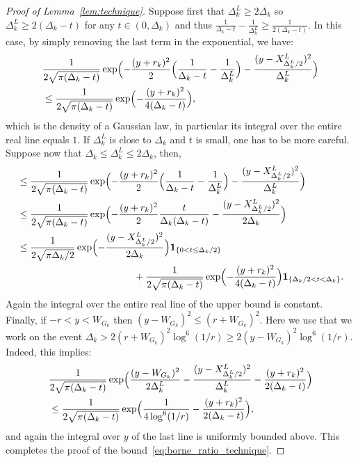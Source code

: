 \documentclass[british, a4paper,11pt]{article}
\numberwithin{equation}{section}
\theoremstyle{definition}
\newcommand{\ind}[1]{\mathbf{1}_{\{#1\}}}
\begin{document}
\begin{proof}[Proof of Lemma~\ref{lem:technique}]
Suppose first that $\Delta^L_k \geq 2 \Delta_k$ so $\Delta^L_k \geq 2 (\Delta_k-t)$ for any $t \in (0, \Delta_k)$ and thus $\frac{1}{\Delta_k-t}-\frac{1}{\Delta^L_k} \geq \frac{1}{2(\Delta_k-t)}$. In this case, by simply removing the last term in the exponential, we have:
\begin{align*}
&\frac{1}{2\sqrt{\pi(\Delta_k-t)}} \exp\Bigl(- \frac{(y+r_{k})^2}{2} \Bigl(\frac{1}{\Delta_k-t}-\frac{1}{\Delta^L_k}\Bigr) - \frac{(y-X^L_{\Delta^L_k/2})^2}{\Delta^L_k}\Bigr)
\\
&\leq \frac{1}{2\sqrt{\pi(\Delta_k-t)}} \exp\Bigl(- \frac{(y+r_{k})^2}{4(\Delta_k-t)}\Bigr)
,\end{align*}
which is the density of a Gaussian law, in particular its integral over the entire real line equals $1$. If $\Delta^L_k$ is close to $\Delta_k$ and $t$ is small, one has to be more careful.
Suppose now that $\Delta_k \leq \Delta^L_k \leq 2 \Delta_k$, then,
\begin{align*}
&\leq \frac{1}{2\sqrt{\pi(\Delta_k-t)}} \exp\Bigl(- \frac{(y+r_{k})^2}{2} \Bigl(\frac{1}{\Delta_k-t}-\frac{1}{\Delta^L_k}\Bigr) - \frac{(y-X^L_{\Delta^L_k/2})^2}{\Delta^L_k}\Bigr)
\\
&\leq \frac{1}{2\sqrt{\pi(\Delta_k-t)}} \exp\Bigl(- \frac{(y+r_{k})^2}{2} \frac{t}{\Delta_k(\Delta_k-t)} - \frac{(y-X^L_{\Delta^L_k/2})^2}{2\Delta_k}\Bigr)
\\
&\leq \frac{1}{2\sqrt{\pi \Delta_k / 2}} \exp\Bigl(- \frac{(y-X^L_{\Delta^L_k/2})^2}{2 \Delta_k}\Bigr) \ind{0 < t \leq \Delta_k/2}\\
& \qquad \qquad \qquad \qquad \qquad  \qquad + \frac{1}{2\sqrt{\pi(\Delta_k-t)}} \exp\Bigl(- \frac{(y+r_{k})^2}{4 (\Delta_k-t)}\Bigr) \ind{\Delta_k/2 < t < \Delta_k}
.\end{align*}
Again the integral over the entire real line of the upper bound is constant.
Finally, if $-r < y < W_{G_k}$ then $(y-W_{G_k})^2 \leq (r+W_{G_k})^2$. Here we use that we work on the event $\Delta_k > 2(r+W_{G_k})^2 \log^6(1/r) \geq 2 (y-W_{G_k})^2 \log^6(1/r)$. Indeed, this implies:
\begin{align*}
&\frac{1}{2\sqrt{\pi(\Delta_k-t)}} \exp\Bigl(\frac{(y-W_{G_k})^2}{2\Delta^L_k} - \frac{(y-X^L_{\Delta^L_k/2})^2}{\Delta^L_k} - \frac{(y+r_{k})^2}{2(\Delta_k-t)}\Bigr)
\\
&\leq \frac{1}{2\sqrt{\pi(\Delta_k-t)}} \exp\Bigl(\frac{1}{4\log^6(1/r)} - \frac{(y+r_{k})^2}{2(\Delta_k-t)}\Bigr)
,\end{align*}
and again the integral over $y$ of the last line is uniformly bounded above.
This completes the proof of the bound~\eqref{eq:borne_ratio_technique}.



\end{proof}
\end{document}
